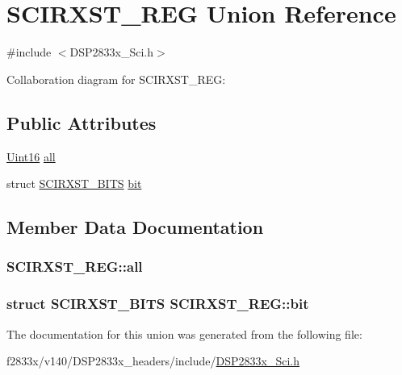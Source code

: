 \hypertarget{union_s_c_i_r_x_s_t___r_e_g}{}\section{S\+C\+I\+R\+X\+S\+T\+\_\+\+R\+E\+G Union Reference}
\label{union_s_c_i_r_x_s_t___r_e_g}


{\ttfamily \#include $<$D\+S\+P2833x\+\_\+\+Sci.\+h$>$}



Collaboration diagram for S\+C\+I\+R\+X\+S\+T\+\_\+\+R\+E\+G\+:
\subsection*{Public Attributes}
\begin{DoxyCompactItemize}
\item 
\hyperlink{_d_s_p2833x___device_8h_a59a9f6be4562c327cbfb4f7e8e18f08b}{Uint16} \hyperlink{union_s_c_i_r_x_s_t___r_e_g_ad062a1410be1a74863f62fbf56416a0a}{all}
\item 
struct \hyperlink{struct_s_c_i_r_x_s_t___b_i_t_s}{S\+C\+I\+R\+X\+S\+T\+\_\+\+B\+I\+T\+S} \hyperlink{union_s_c_i_r_x_s_t___r_e_g_ac508c405e6a03c4408d263ac38dec492}{bit}
\end{DoxyCompactItemize}


\subsection{Member Data Documentation}
\hypertarget{union_s_c_i_r_x_s_t___r_e_g_ad062a1410be1a74863f62fbf56416a0a}{}
\subsubsection[{all}]{ S\+C\+I\+R\+X\+S\+T\+\_\+\+R\+E\+G\+::all}\label{union_s_c_i_r_x_s_t___r_e_g_ad062a1410be1a74863f62fbf56416a0a}
\hypertarget{union_s_c_i_r_x_s_t___r_e_g_ac508c405e6a03c4408d263ac38dec492}{}
\subsubsection[{bit}]{\setlength{\rightskip}{0pt plus 5cm}struct {\bf S\+C\+I\+R\+X\+S\+T\+\_\+\+B\+I\+T\+S} S\+C\+I\+R\+X\+S\+T\+\_\+\+R\+E\+G\+::bit}\label{union_s_c_i_r_x_s_t___r_e_g_ac508c405e6a03c4408d263ac38dec492}


The documentation for this union was generated from the following file\+:\begin{DoxyCompactItemize}
\item 
f2833x/v140/\+D\+S\+P2833x\+\_\+headers/include/\hyperlink{_d_s_p2833x___sci_8h}{D\+S\+P2833x\+\_\+\+Sci.\+h}\end{DoxyCompactItemize}

